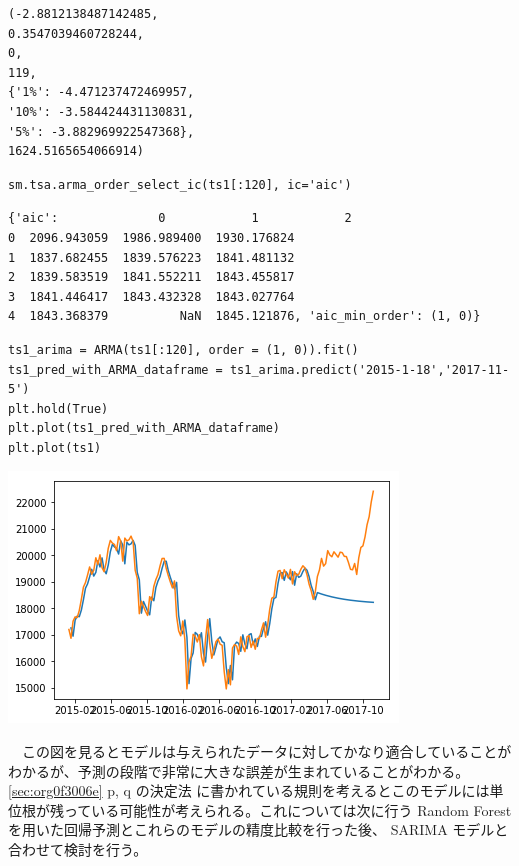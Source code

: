 \documentclass{scrartcl}
\begin{document}
\begin{verbatim}
(-2.8812138487142485,
0.3547039460728244,
0,
119,
{'1%': -4.471237472469957,
'10%': -3.584424431130831,
'5%': -3.882969922547368},
1624.5165654066914)
\end{verbatim}

\begin{verbatim}
sm.tsa.arma_order_select_ic(ts1[:120], ic='aic')
\end{verbatim}

\begin{verbatim}
{'aic':              0            1            2
0  2096.943059  1986.989400  1930.176824
1  1837.682455  1839.576223  1841.481132
2  1839.583519  1841.552211  1843.455817
3  1841.446417  1843.432328  1843.027764
4  1843.368379          NaN  1845.121876, 'aic_min_order': (1, 0)}
\end{verbatim}

\begin{verbatim}
ts1_arima = ARMA(ts1[:120], order = (1, 0)).fit()
ts1_pred_with_ARMA_dataframe = ts1_arima.predict('2015-1-18','2017-11-5')
plt.hold(True)
plt.plot(ts1_pred_with_ARMA_dataframe)
plt.plot(ts1)
\end{verbatim}

\begin{center}
\includegraphics[width=.9\linewidth]{./obipy-resources/cAoUWN.png}
\end{center}

　この図を見るとモデルは与えられたデータに対してかなり適合していることがわかるが、予測の段階で非常に大きな誤差が生まれていることがわかる。 \ref{sec:org0f3006e} p, q の決定法 に書かれている規則を考えるとこのモデルには単位根が残っている可能性が考えられる。これについては次に行う Random Forest を用いた回帰予測とこれらのモデルの精度比較を行った後、 SARIMA モデルと合わせて検討を行う。\\
\end{document}
